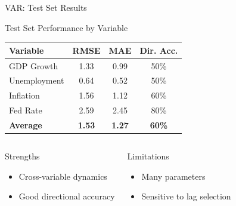 \documentclass[9pt, aspectratio=169, t]{beamer}
\begin{document}
\begin{frame}{VAR: Test Set Results}
    \vspace{-0.1cm}
    {\footnotesize
    \begin{block}{Test Set Performance by Variable}
        \begin{center}
        \footnotesize
        \begin{tabular}{lccc}
            \toprule
            \textbf{Variable} & \textbf{RMSE} & \textbf{MAE} & \textbf{Dir. Acc.} \\
            \midrule
            GDP Growth & 1.33 & 0.99 & 50\% \\
            Unemployment & 0.64 & 0.52 & 50\% \\
            Inflation & 1.56 & 1.12 & 60\% \\
            Fed Rate & 2.59 & 2.45 & 80\% \\
            \midrule
            \textbf{Average} & \textbf{1.53} & \textbf{1.27} & \textbf{60\%} \\
            \bottomrule
        \end{tabular}
        \end{center}
    \end{block}

    \vspace{0.1cm}

    \begin{columns}[T]
        \begin{exampleblock}{Strengths}
            \begin{itemize}\setlength{\itemsep}{0pt}
                \item Cross-variable dynamics
                \item Good directional accuracy
            \end{itemize}
        \end{exampleblock}

        \begin{alertblock}{Limitations}
            \begin{itemize}\setlength{\itemsep}{0pt}
                \item Many parameters
                \item Sensitive to lag selection
            \end{itemize}
        \end{alertblock}
    \end{columns}
    }
\end{frame}
\end{document}
